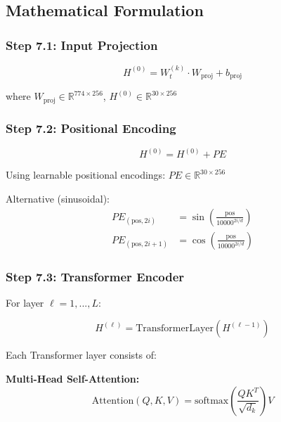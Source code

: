 \documentclass[12pt]{article}
\begin{document}
\subsection{Mathematical Formulation}

\subsubsection{Step 7.1: Input Projection}

\begin{equation}
H^{(0)} = W_t^{(k)} \cdot W_{\text{proj}} + b_{\text{proj}}
\end{equation}

where $W_{\text{proj}} \in \mathbb{R}^{774 \times 256}$, $H^{(0)} \in \mathbb{R}^{30 \times 256}$

\subsubsection{Step 7.2: Positional Encoding}

\begin{equation}
H^{(0)} = H^{(0)} + PE
\end{equation}

Using learnable positional encodings: $PE \in \mathbb{R}^{30 \times 256}$

Alternative (sinusoidal):
\begin{equation}
\begin{aligned}
PE_{(\text{pos}, 2i)} &= \sin\left(\frac{\text{pos}}{10000^{2i/d}}\right) \\
PE_{(\text{pos}, 2i+1)} &= \cos\left(\frac{\text{pos}}{10000^{2i/d}}\right)
\end{aligned}
\end{equation}

\subsubsection{Step 7.3: Transformer Encoder}

For layer $\ell = 1, ..., L$:

\begin{equation}
H^{(\ell)} = \text{TransformerLayer}(H^{(\ell-1)})
\end{equation}

Each Transformer layer consists of:

\textbf{Multi-Head Self-Attention:}
\begin{equation}
\text{Attention}(Q, K, V) = \text{softmax}\left(\frac{QK^T}{\sqrt{d_k}}\right)V
\end{equation}
\end{document}
